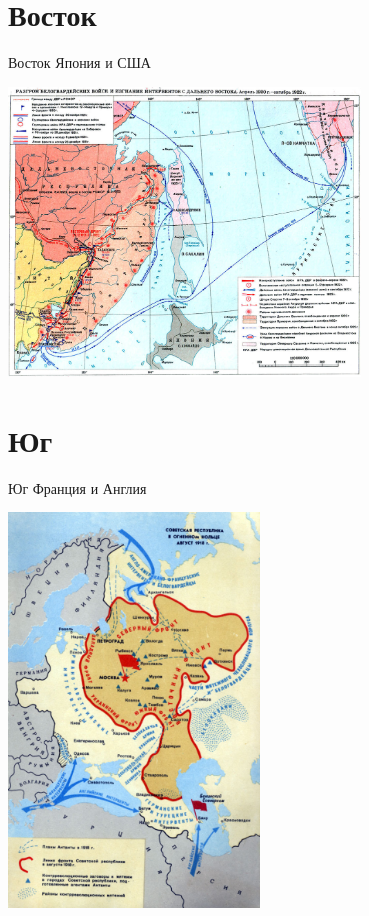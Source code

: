 \section{Восток}
\begin{frame}{Восток}
	Япония и США


	\includegraphics[width=0.7\textwidth]{images/int-east.jpg}
\end{frame}




\section{Юг}
\begin{frame}{Юг}
	Франция и Англия


	\includegraphics[width=0.5\textwidth]{images/int-south.jpg}
\end{frame}



